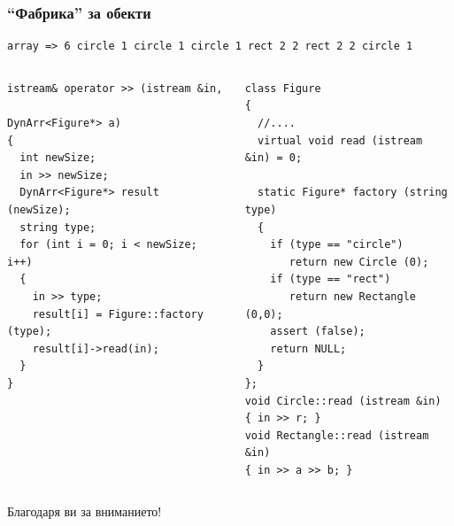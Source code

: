 \documentclass{beamer}
\begin{document}
\begin{frame}[fragile]
\frametitle{``Фабрика'' за обекти}



\begin{flushleft}
\begin{lstlisting}
array => 6 circle 1 circle 1 circle 1 rect 2 2 rect 2 2 circle 1
\end{lstlisting}
\end{flushleft}

\begin{columns}[t]
  \begin{column}{0.5\textwidth}
\begin{flushleft}
\begin{lstlisting}
istream& operator >> (istream &in,
                      DynArr<Figure*> a)
{
  int newSize;
  in >> newSize;
  DynArr<Figure*> result (newSize);
  string type;
  for (int i = 0; i < newSize; i++)
  {
    in >> type;
    result[i] = Figure::factory (type);
    result[i]->read(in);
  }
}
\end{lstlisting}
\end{flushleft}
  \end{column}
  \begin{column}{0.5\textwidth}
\begin{flushleft}
\begin{lstlisting}
class Figure
{
  //....
  virtual void read (istream &in) = 0;

  static Figure* factory (string type)
  {
    if (type == "circle")
       return new Circle (0);
    if (type == "rect")
       return new Rectangle (0,0);
    assert (false);
    return NULL;
  }
};
void Circle::read (istream &in)
{ in >> r; }
void Rectangle::read (istream &in)
{ in >> a >> b; }
\end{lstlisting}
\end{flushleft}

  \end{column}
\end{columns}


\end{frame}


\begin{frame}
\centerline{Благодаря ви за вниманието!}
\end{frame}
\end{document}
